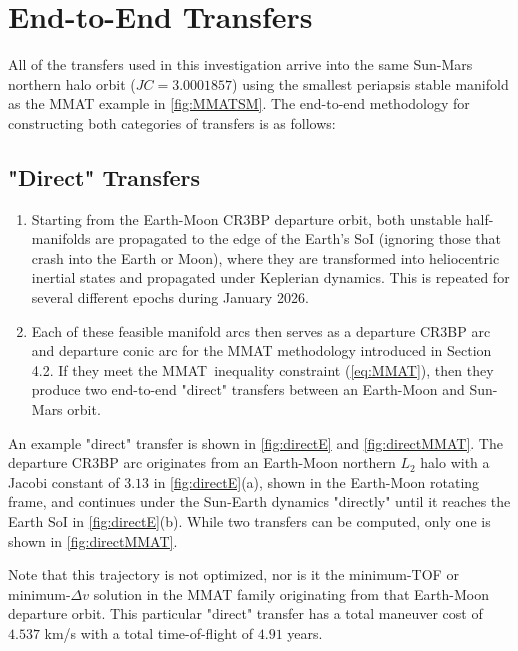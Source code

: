 \section{End-to-End Transfers}
All of the transfers used in this investigation arrive into the same Sun-Mars northern halo orbit
($JC=3.0001857$) using the smallest periapsis stable manifold as the MMAT example in
\cref{fig:MMATSM}. The end-to-end methodology for constructing both categories of transfers is as
follows:

\subsection{"Direct" Transfers}
\begin{enumerate}
    \item   Starting from the Earth-Moon CR3BP departure orbit, both unstable half-manifolds are
            propagated to the edge of the Earth's SoI (ignoring those that crash into the Earth or
            Moon), where they are transformed into heliocentric inertial states and propagated
            under Keplerian dynamics. This is repeated for several different epochs during January
            2026.
    \item   Each of these feasible manifold arcs then serves as a departure CR3BP arc and departure
            conic arc for the MMAT methodology introduced in Section 4.2. If they meet the MMAT\
            inequality constraint (\cref{eq:MMAT}), then they produce two end-to-end "direct"
            transfers between an Earth-Moon and Sun-Mars orbit.
\end{enumerate}

An example "direct" transfer is shown in \cref{fig:directE} and \cref{fig:directMMAT}. The
departure CR3BP arc originates from an Earth-Moon northern $L_{2}$ halo with a Jacobi constant of
$3.13$ in \cref{fig:directE}(a), shown in the Earth-Moon rotating frame, and continues under the
Sun-Earth dynamics "directly" until it reaches the Earth SoI in \cref{fig:directE}(b). While two
transfers can be computed, only one is shown in \cref{fig:directMMAT}.

Note that this trajectory is not optimized, nor is it the minimum-TOF or minimum-$\Delta v$
solution in the MMAT family originating from that Earth-Moon departure orbit. This particular
"direct" transfer has a total maneuver cost of $4.537$ km/s with a total time-of-flight of $4.91$
years.

